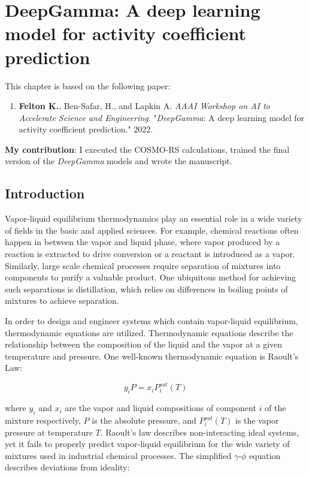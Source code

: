 \chapter{DeepGamma: A deep learning model for activity coefficient prediction}\label{ch:deep_gamma} 
This chapter is based on the following paper:
\begin{enumerate}
\item \textbf{Felton K.}, Ben-Safar, H., and Lapkin A. \textit{AAAI Workshop on AI to Accelerate Science and Engineering}. "\textit{DeepGamma}: A deep learning model for activity coefficient prediction." 2022.
\end{enumerate}
\textbf{My contribution}: I executed the COSMO-RS calculations, trained the final version of the \textit{DeepGamma} models and wrote the manuscript.

\section{Introduction}

Vapor-liquid equilibrium thermodynamics play an essential role in a wide variety of fields in the basic and applied sciences. For example, chemical reactions often happen in between the vapor and liquid phase, where vapor produced by a reaction is extracted to drive conversion or a reactant is introduced as a vapor. Similarly, large scale chemical processes require separation of mixtures into components to purify a valuable product. One ubiquitous method for achieving such separations is distillation, which relies on differences in boiling points of mixtures to achieve separation.

In order to design and engineer systems which contain vapor-liquid equilibrium, thermodynamic equations are utilized. Thermodynamic equations describe the relationship between the composition of the liquid and the vapor at a given temperature and pressure. One well-known thermodynamic equation is Raoult's Law: 

\begin{equation}
    \label{ideal-gas}
    y_i P = x_iP_i^{sat}(T)
\end{equation}

where $y_i$ and $x_i$ are the vapor and liquid compositions of component $i$ of the mixture respectively, $P$ is the absolute pressure, and $P_i^{sat}(T)$ is the vapor pressure at temperature $T$. Raoult's law describes non-interacting ideal systems, yet it fails to properly predict vapor-liquid equilibrium for the wide variety of mixtures used in industrial chemical processes. The simplified $\gamma$-$\phi$ equation describes deviations from ideality:

